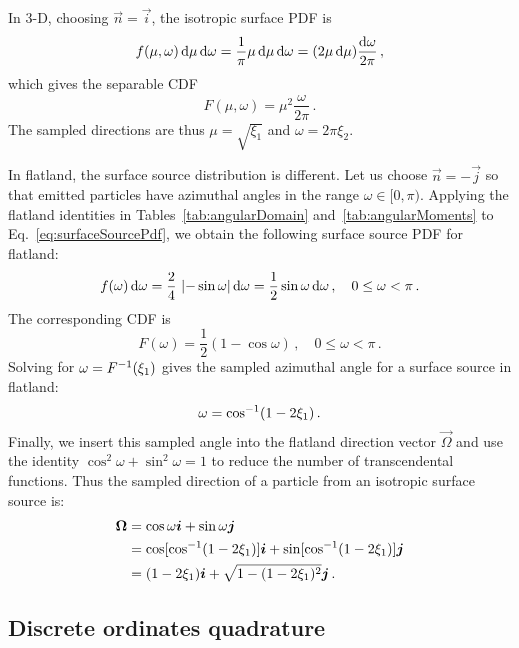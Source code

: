In 3-D, choosing $\vec{n}=\vec{i}$, the isotropic surface PDF is
\begin{equation*}
  f(\mu,\omega) \mathop{}\!\mathrm{d}\mu \mathop{}\!\mathrm{d}\omega
  = \frac{1}{\pi} \mu \mathop{}\!\mathrm{d}\mu \mathop{}\!\mathrm{d}\omega
  = (2 \mu \mathop{}\!\mathrm{d}\mu) \frac{\mathop{}\!\mathrm{d}\omega}{2\pi}\,,
\end{equation*}
which gives the separable CDF
\begin{equation*}
  F(\mu,\omega) = \mu^2 \frac{\omega}{2\pi}\,.
\end{equation*}
The sampled directions are thus $\mu=\sqrt{\xi_1}$ and $\omega=2\pi \xi_2$.

In flatland, the surface source distribution is different. Let us choose
$\vec{n} = -\vec{j}$ so that emitted particles have azimuthal angles in the range
$\omega \in [0, \pi)$.
Applying the flatland identities in Tables~\ref{tab:angularDomain}
and~\ref{tab:angularMoments} to Eq.~\eqref{eq:surfaceSourcePdf}, we obtain
the following surface source PDF for flatland:
\begin{equation*}
  f(\omega) \mathop{}\!\mathrm{d}\omega = \frac{2}{4} \, \left|  -\sin \omega \right|\mathop{}\!\mathrm{d}\omega
  = \frac{1}{2} \sin \omega\mathop{}\!\mathrm{d}\omega \,,\quad 0 \le \omega < \pi\,.
\end{equation*}
The corresponding CDF is
\begin{equation}\label{eq:surfaceSourceFlatland}
  F(\omega) = \frac{1}{2} \left( 1-\cos\omega \right)
  \,,\quad 0 \le \omega < \pi\,.
\end{equation}
Solving for $\omega = F^{-1}(\xi_1)$ gives the sampled azimuthal angle for a surface source
in flatland:
\begin{equation*}
  \omega = \cos^{-1}(1 - 2\xi_1)\,.
\end{equation*}
Finally, we insert this sampled angle into the flatland
direction vector $\vec{\Omega}$ and use the identity
$\cos^2 \omega + \sin^2 \omega = 1$ to reduce the number of transcendental
functions. Thus the sampled direction of a particle from an isotropic surface
source is:
\begin{align*}
  \bm{\Omega} &= \cos \omega \bm{i} + \sin \omega \bm{j} \\
  &=  \cos[ \cos^{-1}(1 - 2\xi_1) ] \bm{i} + \sin[ \cos^{-1}(1 - 2\xi_1) ] \bm{j} \\
  &= (1 - 2\xi_1) \bm{i} + \sqrt{1 - (1 - 2\xi_1)^2} \bm{j}\,.
\end{align*}

\subsection{Discrete ordinates quadrature}

